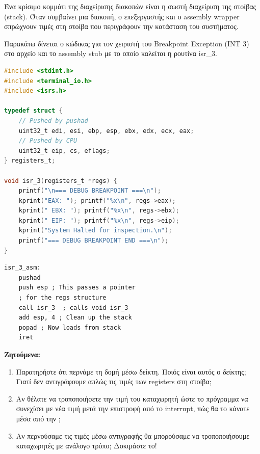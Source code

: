 \documentclass[18pt]{extarticle}
\begin{document}
\begin{question}
    Ένα κρίσιμο κομμάτι της διαχείρισης διακοπών είναι η σωστή διαχείριση της στοίβας (stack). Όταν συμβαίνει μια διακοπή, 
    ο επεξεργαστής και ο assembly wrapper σπρώχνουν τιμές στη στοίβα που περιγράφουν την κατάσταση του συστήματος.

    Παρακάτω δίνεται ο κώδικας για τον χειριστή του Breakpoint Exception (INT 3) στο αρχείο  και το assembly stub με το οποίο
    καλείται η ρουτίνα isr\_3.

    \begin{file}[isr\_3.c]
        \footnotesize \begin{lstlisting}[language=C, tabsize=2]
#include <stdint.h>
#include <terminal_io.h>
#include <isrs.h>

typedef struct {
    // Pushed by pushad
    uint32_t edi, esi, ebp, esp, ebx, edx, ecx, eax; 
    // Pushed by CPU
    uint32_t eip, cs, eflags;                        
} registers_t;

void isr_3(registers_t *regs) {
    printf("\n=== DEBUG BREAKPOINT ===\n");
    kprint("EAX: "); printf("%x\n", regs->eax);
    kprint(" EBX: "); printf("%x\n", regs->ebx);
    kprint(" EIP: "); printf("%x\n", regs->eip);
    kprint("System Halted for inspection.\n");
    printf("=== DEBUG BREAKPOINT END ===\n");
}
        \end{lstlisting}
    \end{file}
    
    \begin{file}
        \footnotesize \begin{lstlisting}[language={[x86masm]Assembler}, tabsize=2]
isr_3_asm:
    pushad
    push esp ; This passes a pointer
    ; for the regs structure
    call isr_3  ; calls void isr_3
    add esp, 4 ; Clean up the stack
    popad ; Now loads from stack
    iret
        \end{lstlisting}
    \end{file}

    \textbf{Ζητούμενα:}

    \begin{enumerate}
        \item Παρατηρήστε ότι περνάμε τη δομή  μέσω δείκτη. Ποιός είναι αυτός ο δείκτης; Γιατί δεν αντιγράφουμε απλώς τις τιμές των registers στη στοίβα;
        \item Αν θέλατε να τροποποιήσετε την τιμή του καταχωρητή  ώστε το πρόγραμμα να συνεχίσει με νέα τιμή μετά την επιστροφή από το interrupt, πώς θα το κάνατε μέσα από την ;
        \item Αν περνούσαμε τις τιμές μέσω αντιγραφής θα μπορούσαμε να τροποποιήσουμε καταχωρητές με ανάλογο τρόπο; Δοκιμάστε το!
    \end{enumerate}

\end{question}
\end{document}
